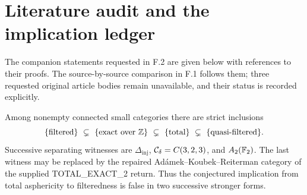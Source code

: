 \section{Literature audit and the implication ledger}
\label{sec:F}

The companion statements requested in F.2 are given below with
references to their proofs. The source-by-source comparison in F.1
follows them; three requested original article bodies remain
unavailable, and their status is recorded explicitly.

\begin{theorem}
\label{F:companion-chain}
Among nonempty connected small categories there are strict inclusions
\[
 \{\text{filtered}\}\ \subsetneq\
 \{\text{exact over }\mathbb Z\}\ \subsetneq\
 \{\text{total}\}\ \subsetneq\
 \{\text{quasi-filtered}\}.
\]
Successive separating witnesses are $\Delta_{\mathrm{inj}}$,
$\mathcal C_\delta=C(3,2,3)$, and $A_2(\mathbb F_2)$. The last witness may be replaced
by the repaired Ad\'amek--Koubek--Reiterman category of the supplied
TOTAL\_EXACT\_2 return. Thus the conjectured implication from total
asphericity to filteredness is false in two successive stronger forms.
\end{theorem}
